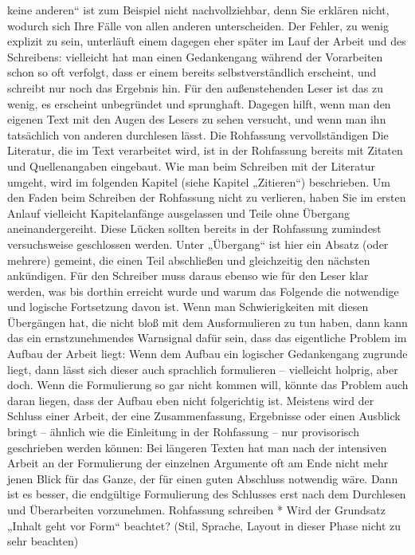 \documentclass[]{book}
\theoremstyle{definition}
\theoremstyle{definition}
\theoremstyle{definition}
\theoremstyle{remark}
\begin{document}
keine anderen`` ist zum Beispiel nicht nachvollziehbar, denn Sie
erklären nicht, wodurch sich Ihre Fälle von allen anderen unterscheiden.
Der Fehler, zu wenig explizit zu sein, unterläuft einem dagegen eher
später im Lauf der Arbeit und des Schreibens: vielleicht hat man einen
Gedankengang während der Vorarbeiten schon so oft verfolgt, dass er
einem bereits selbstverständlich erscheint, und schreibt nur noch das
Ergebnis hin. Für den außenstehenden Leser ist das zu wenig, es
erscheint unbegründet und sprunghaft. Dagegen hilft, wenn man den
eigenen Text mit den Augen des Lesers zu sehen versucht, und wenn man
ihn tatsächlich von anderen durchlesen lässt. Die Rohfassung
vervollständigen Die Literatur, die im Text verarbeitet wird, ist in der
Rohfassung bereits mit Zitaten und Quellenangaben eingebaut. Wie man
beim Schreiben mit der Literatur umgeht, wird im folgenden Kapitel
(siehe Kapitel „Zitieren``) beschrieben. Um den Faden beim Schreiben der
Rohfassung nicht zu verlieren, haben Sie im ersten Anlauf vielleicht
Kapitelanfänge ausgelassen und Teile ohne Übergang aneinandergereiht.
Diese Lücken sollten bereits in der Rohfassung zumindest versuchsweise
geschlossen werden. Unter „Übergang`` ist hier ein Absatz (oder mehrere)
gemeint, die einen Teil abschließen und gleichzeitig den nächsten
ankündigen. Für den Schreiber muss daraus ebenso wie für den Leser klar
werden, was bis dorthin erreicht wurde und warum das Folgende die
notwendige und logische Fortsetzung davon ist. Wenn man Schwierigkeiten
mit diesen Übergängen hat, die nicht bloß mit dem Ausformulieren zu tun
haben, dann kann das ein ernstzunehmendes Warnsignal dafür sein, dass
das eigentliche Problem im Aufbau der Arbeit liegt: Wenn dem Aufbau ein
logischer Gedankengang zugrunde liegt, dann lässt sich dieser auch
sprachlich formulieren -- vielleicht holprig, aber doch. Wenn die
Formulierung so gar nicht kommen will, könnte das Problem auch daran
liegen, dass der Aufbau eben nicht folgerichtig ist. Meistens wird der
Schluss einer Arbeit, der eine Zusammenfassung, Ergebnisse oder einen
Ausblick bringt -- ähnlich wie die Einleitung in der Rohfassung -- nur
provisorisch geschrieben werden können: Bei längeren Texten hat man nach
der intensiven Arbeit an der Formulierung der einzelnen Argumente oft am
Ende nicht mehr jenen Blick für das Ganze, der für einen guten Abschluss
notwendig wäre. Dann ist es besser, die endgültige Formulierung des
Schlusses erst nach dem Durchlesen und Überarbeiten vorzunehmen.
Rohfassung schreiben * Wird der Grundsatz „Inhalt geht vor Form``
beachtet? (Stil, Sprache, Layout in dieser Phase nicht zu sehr beachten)
\end{document}
